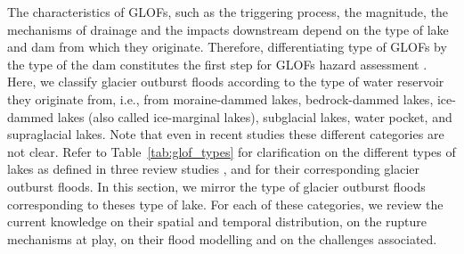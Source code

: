 The characteristics of GLOFs, such as the triggering process, the magnitude, the mechanisms of drainage and the impacts downstream depend on the type of lake and dam from which they originate. Therefore, differentiating type of GLOFs by the type of the dam constitutes the first step for GLOFs hazard assessment \citep{Allen&al2022}. Here, we classify glacier outburst floods according to the type of water reservoir they originate from, i.e., from moraine-dammed lakes, bedrock-dammed lakes, ice-dammed lakes (also called ice-marginal lakes), subglacial lakes, water pocket, and supraglacial lakes. Note that even in recent studies \citep[e.g.][]{Lutzow&al2023,Zhang&al2024} these different categories are not clear. Refer to Table~\ref{tab:glof_types} for clarification on the different types of lakes as defined in three review studies \citep{Roberts2005,Lutzow&al2023,Zhang&al2024}, and for their corresponding glacier outburst floods. In this section, we mirror the type of glacier outburst floods corresponding to theses type of lake. For each of these categories, we review the current knowledge on their spatial and temporal distribution, on the rupture mechanisms at play, on their flood modelling and on the challenges associated. 


